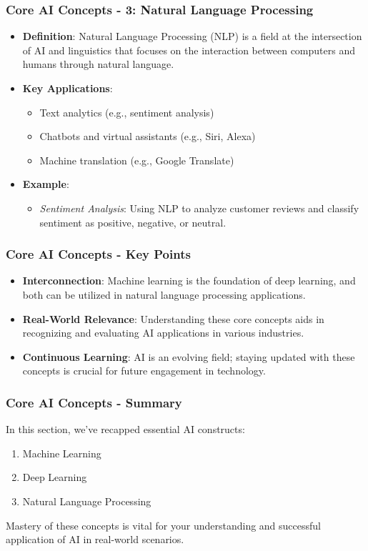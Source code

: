 \documentclass{beamer}
\begin{document}
\begin{frame}[fragile]
    \frametitle{Core AI Concepts - 3: Natural Language Processing}
    \begin{itemize}
        \item \textbf{Definition}: Natural Language Processing (NLP) is a field at the intersection of AI and linguistics that focuses on the interaction between computers and humans through natural language.
        
        \item \textbf{Key Applications}:
        \begin{itemize}
            \item Text analytics (e.g., sentiment analysis)
            \item Chatbots and virtual assistants (e.g., Siri, Alexa)
            \item Machine translation (e.g., Google Translate)
        \end{itemize}
        
        \item \textbf{Example}: 
        \begin{itemize}
            \item \textit{Sentiment Analysis}: Using NLP to analyze customer reviews and classify sentiment as positive, negative, or neutral.
        \end{itemize}
    \end{itemize}
\end{frame}

\begin{frame}[fragile]
    \frametitle{Core AI Concepts - Key Points}
    \begin{itemize}
        \item \textbf{Interconnection}: Machine learning is the foundation of deep learning, and both can be utilized in natural language processing applications.
        \item \textbf{Real-World Relevance}: Understanding these core concepts aids in recognizing and evaluating AI applications in various industries.
        \item \textbf{Continuous Learning}: AI is an evolving field; staying updated with these concepts is crucial for future engagement in technology.
    \end{itemize}
\end{frame}

\begin{frame}[fragile]
    \frametitle{Core AI Concepts - Summary}
    In this section, we've recapped essential AI constructs: 
    \begin{enumerate}
        \item Machine Learning
        \item Deep Learning
        \item Natural Language Processing
    \end{enumerate}
    Mastery of these concepts is vital for your understanding and successful application of AI in real-world scenarios.
\end{frame}
\end{document}
